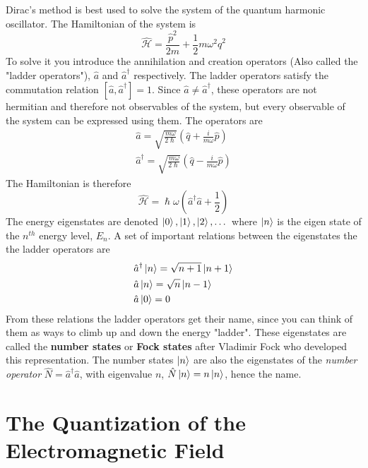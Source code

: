 Dirac's method is best used to solve the system of the quantum harmonic oscillator. The Hamiltonian of the system is
\[
    \hat{\mathcal{H}} = \frac{\hat{p}^2}{2m} + \frac{1}{2}m\omega^2 \hat{q}^2
\]
To solve it you introduce the annihilation and creation operators (Also called the "ladder operators"), $\hat{a}$ and $\hat{a}^\dag$ respectively. The ladder operators satisfy the commutation relation $[\hat{a}, \hat{a}^\dag] = 1$. Since $\hat{a} \ne \hat{a}^\dag$, these operators are not hermitian and therefore not observables of the system, but every observable of the system can be expressed using them. The operators are
\begin{align*}
    \hat{a} = \sqrt{\frac{m \omega}{2\hslash}} (\hat{q} + \frac{i}{m\omega}\hat{p}) \\
    \hat{a}^\dag = \sqrt{\frac{m \omega}{2\hslash}} (\hat{q} - \frac{i}{m\omega}\hat{p})
\end{align*}
The Hamiltonian is therefore
\[
    \hat{\mathcal{H}} = \hslash \omega (\hat{a}^\dag\hat{a} + \frac{1}{2})
\]
The energy eigenstates are denoted $\ket{0}, \ket{1}, \ket{2}, \dots$ where $\ket{n}$ is the eigen state of the $n^{th}$ energy level, $E_n$. A set of  important relations between the eigenstates the the ladder operators are
\begin{align*}
    &\hat{a}^\dag \ket{n} = \sqrt{n+1}\ket{n+1} \\
    &\hat{a} \ket{n} = \sqrt{n}\ket{n-1} \\
    &\hat{a} \ket{0} = 0
\end{align*}
From these relations the ladder operators get their name, since you can think of them as ways to climb up and down the energy "ladder". These eigenstates are called the \textbf{number states} or \textbf{Fock states} after Vladimir Fock who developed this representation. The number states $\ket{n}$ are also the eigenstates of the \textit{number operator} $\hat{N} = \hat{a}^\dag\hat{a}$, with eigenvalue $n$, $\hat{N}\ket{n} =  n\ket{n}$, hence the name.

\section{The Quantization of the Electromagnetic Field}
